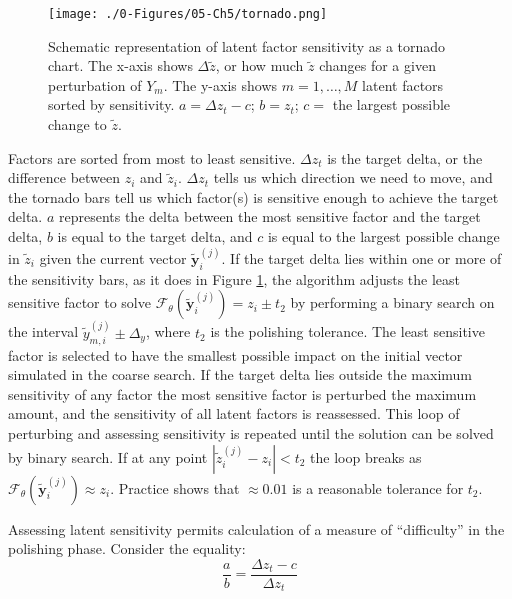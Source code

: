 \begin{figure}[htb!]
    \centering
    \texttt{[image: ./0-Figures/05-Ch5/tornado.png]}
    \caption{Schematic representation of latent factor sensitivity as a tornado chart. The x-axis shows $\Delta \tilde{z}$, or how much $\tilde{z}$ changes for a given perturbation of $Y_{m}$. The y-axis shows $m=1,\dots,M$ latent factors sorted by sensitivity. $a = \Delta z_{t} - c$; $b=z_{t}$; $c=$ the largest possible change to $\tilde{z}$.}
    \label{fig:tornado}
\end{figure}

Factors are sorted from most to least sensitive. $\Delta z_{t}$ is the target delta, or the difference between $z_{i}$ and $\tilde{z}_{i}$. $\Delta z_{t}$ tells us which direction we need to move, and the tornado bars tell us which factor(s) is sensitive enough to achieve the target delta. $a$ represents the delta between the most sensitive factor and the target delta, $b$ is equal to the target delta, and $c$ is equal to the largest possible change in $\tilde{z}_{i}$ given the current vector $\tilde{\mathbf{y}}_{i}^{(j)}$. If the target delta lies within one or more of the sensitivity bars, as it does in Figure \ref{fig:tornado}, the algorithm adjusts the least sensitive factor to solve $\mathcal{F}_{\theta}(\tilde{\mathbf{y}}_{i}^{(j)}) = z_{i} \pm t_{2}$ by performing a binary search \citep{nowak2008generalized} on the interval $\tilde{y}_{m, i}^{(j)} \pm \Delta_{y}$, where $t_{2}$ is the polishing tolerance. The least sensitive factor is selected to have the smallest possible impact on the initial vector simulated in the coarse search. If the target delta lies outside the maximum sensitivity of any factor the most sensitive factor is perturbed the maximum amount, and the sensitivity of all latent factors is reassessed. This loop of perturbing and assessing sensitivity is repeated until the solution can be solved by binary search. If at any point $|\tilde{z}_{i}^{(j)} - z_{i}| < t_{2}$ the loop breaks as $\mathcal{F}_{\theta}(\tilde{\mathbf{y}}_{i}^{(j)}) \approx z_{i}$. Practice shows that $\approx 0.01$ is a reasonable tolerance for $t_2$.

Assessing latent sensitivity permits calculation of a measure of ``difficulty'' in the polishing phase. Consider the equality:
\begin{equation}
    \frac{a}{b} = \frac{\Delta z_{t} - c}{\Delta z_{t}}
    \label{eq:aoverb}
\end{equation}

